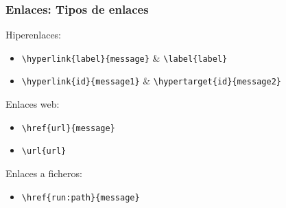 \begin{frame}[fragile]
\frametitle{Enlaces: Tipos de enlaces}

Hiperenlaces:
\begin{itemize}
    \item \verb|\hyperlink{label}{message}| \& \verb|\label{label}|
    \item \verb|\hyperlink{id}{message1}| \& \verb|\hypertarget{id}{message2}|
\end{itemize}

\vspace{0.5cm}

Enlaces web:
\begin{itemize}
    \item \verb|\href{url}{message}|
    \item \verb|\url{url}|
\end{itemize}

\vspace{0.5cm}

Enlaces a ficheros:
\begin{itemize}
    \item \verb|\href{run:path}{message}|
\end{itemize}


\end{frame}

